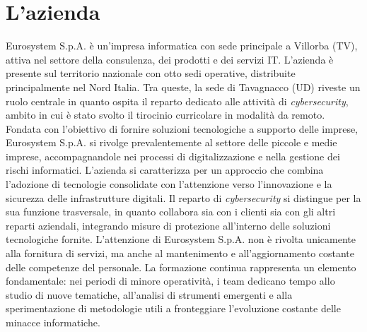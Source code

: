 \section{L'azienda}
Eurosystem S.p.A. è un'impresa informatica con sede principale a Villorba (TV), attiva nel settore della consulenza, dei prodotti e dei servizi IT. L'azienda è presente sul territorio nazionale con otto sedi operative, distribuite principalmente nel Nord Italia. Tra queste, la sede di Tavagnacco (UD) riveste un ruolo centrale in quanto ospita il reparto dedicato alle attività di \textit{cybersecurity}, ambito in cui è stato svolto il tirocinio curricolare in modalità da remoto.  
Fondata con l'obiettivo di fornire soluzioni tecnologiche a supporto delle imprese, Eurosystem S.p.A. si rivolge prevalentemente al settore delle piccole e medie imprese, accompagnandole nei processi di digitalizzazione e nella gestione dei rischi informatici. L'azienda si caratterizza per un approccio che combina l'adozione di tecnologie consolidate con l'attenzione verso l'innovazione e la sicurezza delle infrastrutture digitali.  
Il reparto di \textit{cybersecurity} si distingue per la sua funzione trasversale, in quanto collabora sia con i clienti sia con gli altri reparti aziendali, integrando misure di protezione all'interno delle soluzioni tecnologiche fornite.  
L'attenzione di Eurosystem S.p.A. non è rivolta unicamente alla fornitura di servizi, ma anche al mantenimento e all'aggiornamento costante delle competenze del personale. La formazione continua rappresenta un elemento fondamentale: nei periodi di minore operatività, i team dedicano tempo allo studio di nuove tematiche, all'analisi di strumenti emergenti e alla sperimentazione di metodologie utili a fronteggiare l'evoluzione costante delle minacce informatiche.  
